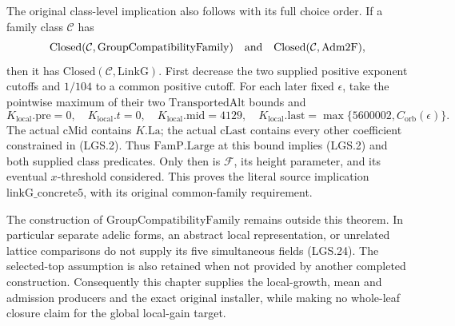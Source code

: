 \documentclass[11pt,a4paper]{article}
\numberwithin{equation}{section}
\theoremstyle{remark}\newtheorem{remark}[theorem]{Remark}
\begin{document}
The original class-level implication also follows
with its full choice order.  If a family class
\(\mathcal C\) has
\[
 \mathrm{Closed}(\mathcal C,\mathrm{GroupCompatibilityFamily})
 \quad\hbox{and}\quad
 \mathrm{Closed}(\mathcal C,\mathrm{Adm2F}),
 \]
then it has \(\mathrm{Closed}(\mathcal C,\mathrm{LinkG})\).
First decrease the two supplied positive exponent
cutoffs and \(1/104\) to a common positive cutoff.
For each later fixed \(\epsilon\), take the pointwise
maximum of their two \(\mathrm{TransportedAlt}\)
bounds and
\[
 K_{\mathrm{local}}.\mathrm{pre}=0,\quad
 K_{\mathrm{local}}.t=0,\quad
 K_{\mathrm{local}}.\mathrm{mid}=4129,\quad
 K_{\mathrm{local}}.\mathrm{last}
             =\max\{5600002,C_{\mathrm{orb}}(\epsilon)\}.
                                                               \tag{LGS.40}
\]
The actual \(\mathrm{cMid}\) contains \(K.\mathrm{La}\);
the actual \(\mathrm{cLast}\) contains every other
coefficient constrained in (LGS.2).
Thus \(\mathrm{FamP.Large}\) at this bound implies
(LGS.2) and both supplied class predicates.
Only then is \(\mathcal F\), its height parameter,
and its eventual \(x\)-threshold considered.
This proves the literal source implication
\(\mathrm{linkG\_\allowbreak concrete5}\), with its original
common-family requirement.

The construction of \(\mathrm{GroupCompatibilityFamily}\)
remains outside this theorem.  In particular separate
adelic forms, an abstract local representation, or
unrelated lattice comparisons do not supply its five
simultaneous fields (LGS.24).  The selected-top
assumption is also retained when not provided by
another completed construction.  Consequently this
chapter supplies the local-growth, mean and admission
producers and the exact original installer, while
making no whole-leaf closure claim for the global
local-gain target.

\endgroup
\end{document}
